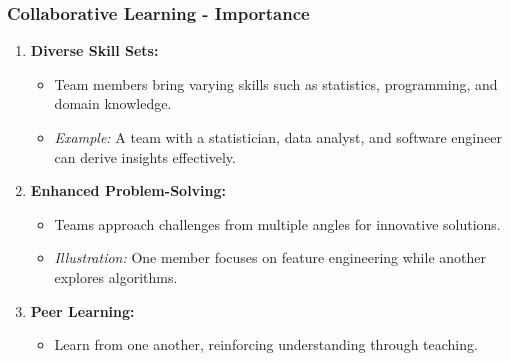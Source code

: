 \documentclass[aspectratio=169]{beamer}
\begin{document}
\begin{frame}[fragile]
    \frametitle{Collaborative Learning - Importance}
    \begin{enumerate}
        \item \textbf{Diverse Skill Sets:}
        \begin{itemize}
            \item Team members bring varying skills such as statistics, programming, and domain knowledge.
            \item \textit{Example:} A team with a statistician, data analyst, and software engineer can derive insights effectively.
        \end{itemize}

        \item \textbf{Enhanced Problem-Solving:}
        \begin{itemize}
            \item Teams approach challenges from multiple angles for innovative solutions.
            \item \textit{Illustration:} One member focuses on feature engineering while another explores algorithms.
        \end{itemize}
        
        \item \textbf{Peer Learning:}
        \begin{itemize}
            \item Learn from one another, reinforcing understanding through teaching.
        \end{itemize}
    \end{enumerate}
\end{frame}
\end{document}
